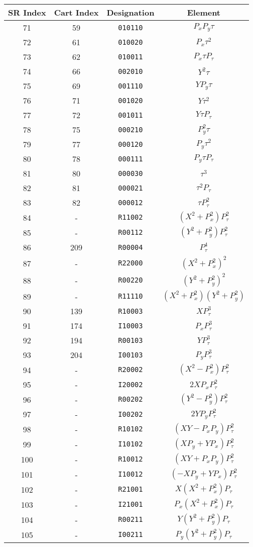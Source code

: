 {{\begin{center}
\newpage
\begin{tabular}{cccc}
SR Index&Cart Index&Designation&Element\\ \hline
   71&59&{\tt 010110}&$P_xP_y{\tau}$\\
   72&61&{\tt 010020}&$P_x{\tau}^2$\\
   73&62&{\tt 010011}&$P_x{\tau}P_{\tau}$\\
   74&66&{\tt 002010}&$Y^2{\tau}$\\
   75&69&{\tt 001110}&$YP_y{\tau}$\\
   76&71&{\tt 001020}&$Y{\tau}^2$\\
   77&72&{\tt 001011}&$Y{\tau}P_{\tau}$\\
   78&75&{\tt 000210}&$P_y^2{\tau}$\\
   79&77&{\tt 000120}&$P_y{\tau}^2$\\
   80&78&{\tt 000111}&$P_y{\tau}P_{\tau}$\\
   81&80&{\tt 000030}&${\tau}^3$\\
   82&81&{\tt 000021}&${\tau}^2P_{\tau}$\\
   83&82&{\tt 000012}&${\tau}P_{\tau}^2$\\
   84&-&{\tt R11002}&$(X^2+P_x^2)P_{\tau}^2$\\
   85&-&{\tt R00112}&$(Y^2+P_y^2)P_{\tau}^2$\\
   86&209&{\tt R00004}&$P_{\tau}^4$\\
   87&-&{\tt R22000}&$(X^2+P_x^2)^2$\\
   88&-&{\tt R00220}&$(Y^2+P_y^2)^2$\\
   89&-&{\tt R11110}&$(X^2+P_x^2)(Y^2+P_y^2)$\\
   90&139&{\tt R10003}&$XP_{\tau}^3$\\
   91&174&{\tt I10003}&$P_xP_{\tau}^3$\\
   92&194&{\tt R00103}&$YP_{\tau}^3$\\
   93&204&{\tt I00103}&$P_yP_{\tau}^3$\\
94&-&{\tt R20002}&$(X^2-P_x^2)P_{\tau}^2$\\
95&-&{\tt I20002}&$2XP_xP_{\tau}^2$\\
96&-&{\tt R00202}&$(Y^2-P_y^2)P_{\tau}^2$\\
97&-&{\tt I00202}&$2YP_yP_{\tau}^2$\\
98&-&{\tt R10102}&$(XY-P_xP_y)P_{\tau}^2$\\
99&-&{\tt I10102}&$(XP_y+YP_x)P_{\tau}^2$\\
100&-&{\tt R10012}&$(XY+P_xP_y)P_{\tau}^2$\\
101&-&{\tt I10012}&$(-XP_y+YP_x)P_{\tau}^2$\\
  102&-&{\tt R21001}&$X(X^2+P_x^2)P_{\tau}$\\
  103&-&{\tt I21001}&$P_x(X^2+P_x^2)P_{\tau}$\\
  104&-&{\tt R00211}&$Y(Y^2+P_y^2)P_{\tau}$\\
  105&-&{\tt I00211}&$P_y(Y^2+P_y^2)P_{\tau}$
\end{tabular}



\end{center}}}
